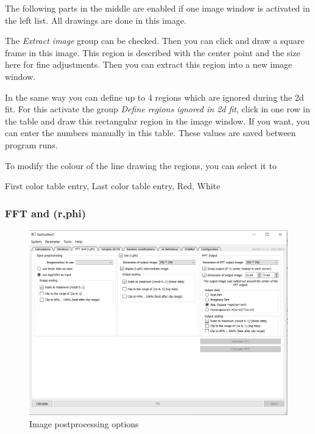 \documentclass[11pt]{article} %
\begin{document}
The following parts in the middle are enabled if one image window is activated in the left list. All drawings are done in this image.

The {\it Extract image} group can be checked. Then you can click and draw a square frame in this image. This region is described with the center point and the size here for fine adjustments. Then you can extract this region into a new image window.

In the same way you can define up to 4 regions which are ignored during the 2d fit. For this activate the group {\it Define regions ignored in 2d fit}, click in one row in the table and draw this rectangular region in the image window. If you want, you can enter the numbers manually in this table. These values are saved between program runs.

To modify the colour of the line drawing the regions, you can select it to 

First color table entry, Last color table entry, Red, White



\subsubsection{FFT and (r,phi)}
\begin{figure}[H]
 \centering
 \includegraphics[width=\textwidth]{gui-fft.png}
 \caption{Image postprocessing options}
\end{figure}
\end{document}
